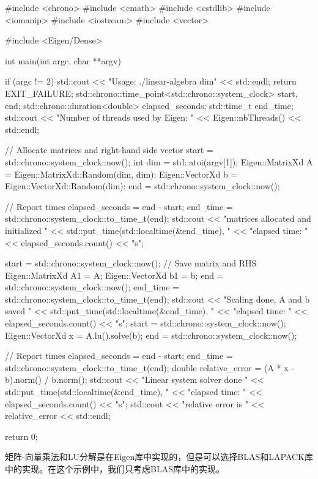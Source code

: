 \begin{codebox}[cpp]
#include <chrono>
#include <cmath>
#include <cstdlib>
#include <iomanip>
#include <iostream>
#include <vector>

#include <Eigen/Dense>

int main(int argc, char **argv)
{
  if (argc != 2)
  {
    std::cout << "Usage: ./linear-algebra dim" << std::endl;
    return EXIT_FAILURE;
  }
  std::chrono::time_point<std::chrono::system_clock> start, end;
  std::chrono::duration<double> elapsed_seconds;
  std::time_t end_time;
  std::cout << "Number of threads used by Eigen: " << Eigen::nbThreads()
            << std::endl;

  // Allocate matrices and right-hand side vector
  start = std::chrono::system_clock::now();
  int dim = std::atoi(argv[1]);
  Eigen::MatrixXd A = Eigen::MatrixXd::Random(dim, dim);
  Eigen::VectorXd b = Eigen::VectorXd::Random(dim);
  end = std::chrono::system_clock::now();

  // Report times
  elapsed_seconds = end - start;
  end_time = std::chrono::system_clock::to_time_t(end);
  std::cout << "matrices allocated and initialized "
            << std::put_time(std::localtime(&end_time), "%
            << "elapsed time: " << elapsed_seconds.count() << "s\n";

  start = std::chrono::system_clock::now();
  // Save matrix and RHS
  Eigen::MatrixXd A1 = A;
  Eigen::VectorXd b1 = b;
  end = std::chrono::system_clock::now();
  end_time = std::chrono::system_clock::to_time_t(end);
  std::cout << "Scaling done, A and b saved "
            << std::put_time(std::localtime(&end_time), "%
            << "elapsed time: " << elapsed_seconds.count() << "s\n";
  start = std::chrono::system_clock::now();
  Eigen::VectorXd x = A.lu().solve(b);
  end = std::chrono::system_clock::now();

  // Report times
  elapsed_seconds = end - start;
  end_time = std::chrono::system_clock::to_time_t(end);
  double relative_error = (A * x - b).norm() / b.norm();
  std::cout << "Linear system solver done "
            << std::put_time(std::localtime(&end_time), "%
            << "elapsed time: " << elapsed_seconds.count() << "s\n";
  std::cout << "relative error is " << relative_error << std::endl;
  
  return 0;
}
\end{codebox}

矩阵-向量乘法和LU分解是在Eigen库中实现的，但是可以选择BLAS和LAPACK库中的实现。在这个示例中，我们只考虑BLAS库中的实现。

